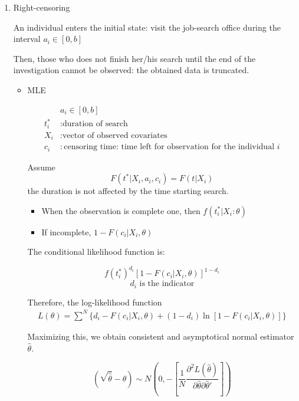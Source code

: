 \documentclass[dvipdfmx, 12pt]{article}
\begin{document}
\begin{enumerate}
  \item Right-censoring

  An individual enters the initial state: visit the job-search office during the interval $a_i \in [0, b]$

  Then, those who does not finish her/his search until the end of the investigation cannot be observed: the obtained data is truncated.

  \begin{itemize}
    \item MLE

    \begin{align*}
      & a_i \in [0, b] \\
      t^*_i &: \text{duration of search} \\
      X_i &: \text{vector of observed covariates} \\
      c_i &: \text{censoring time: time left for observation for the individual }i
    \end{align*}

    Assume
    \[
    F(t^* | X_i, a_i, c_i) = F(t | X_i)
    \]
    the duration is not affected by the time starting search.

    \begin{itemize}
      \item When the observation is complete one, then $f(t^*_i | X_i: \theta)$

      \item If incomplete, $1 - F(c_i | X_i, \theta)$
    \end{itemize}

    The conditional likelihood function is:

    \[
    f(t^*_i)^{d_i} [1 - F(c_i | X_i, \theta)]^{1 - d_i}
    \]
    \[
    d_i \text{ is the indicator}
    \]

    Therefore, the log-likelihood function
    \begin{align*}
      L(\theta) = \sum^N \{ d_i - F (c_i | X_i, \theta) + (1 - d_i) \ln [1 - F(c_i | X_i, \theta)] \}
    \end{align*}

    Maximizing this, we obtain consistent and asymptotical normal estimator $\hat{\theta}$.

    \[
    (\sqrt{\hat{\theta}} - \theta) \sim N \left( 0, - \left[\dfrac{1}{N} \dfrac{\partial^2 L(\hat{\theta})}{\partial \hat{\theta} \partial \hat{\theta}'} \right]\right)
    \]
  \end{itemize}


\end{enumerate}
\end{document}
